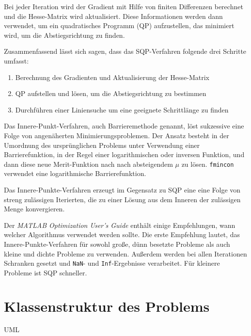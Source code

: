 Bei jeder Iteration wird der Gradient mit Hilfe von finiten Differenzen berechnet und die Hesse-Matrix wird aktualisiert. Diese Informationen werden dann verwendet, um ein quadratisches Programm (QP) aufzustellen, das minimiert wird, um die Abstiegsrichtung zu finden.

Zusammenfassend lässt sich sagen, dass das SQP-Verfahren folgende drei Schritte umfasst:
\begin{enumerate}
    \item Berechnung des Gradienten und Aktualisierung der Hesse-Matrix
    \item QP aufstellen und lösen, um die Abstiegsrichtung zu bestimmen
    \item Durchführen einer Liniensuche um eine geeignete Schrittlänge zu finden
\end{enumerate}

Das Innere-Punkt-Verfahren, auch Barrieremethode genannt, löst sukzessive eine Folge von angenäherten Minimierungsproblemen. Der Ansatz besteht in der Umordnung des ursprünglichen Problems unter Verwendung einer Barrierefunktion, in der Regel einer logarithmischen oder inversen Funktion, und dann diese neue Merit-Funktion nach nach absteigendem $\mu$ zu lösen. \texttt{fmincon} verwendet eine logarithmische Barrierefunktion.

Das Innere-Punkte-Verfahren erzeugt im Gegensatz zu SQP eine eine Folge von streng zulässigen Iterierten, die zu einer Lösung aus dem Inneren der zulässigen Menge konvergieren.

Der \textit{MATLAB Optimization User's Guide} enthält einige Empfehlungen, wann welcher Algorithmus verwendet werden sollte. Die erste Empfehlung lautet, das Innere-Punkte-Verfahren für sowohl große, dünn besetzte Probleme als auch kleine und dichte Probleme zu verwenden. Außerdem werden bei allen Iterationen Schranken gesetzt und \texttt{NaN}- und \texttt{Inf}-Ergebnisse verarbeitet. Für kleinere Probleme ist SQP schneller.


\section{Klassenstruktur des Problems}

UML

